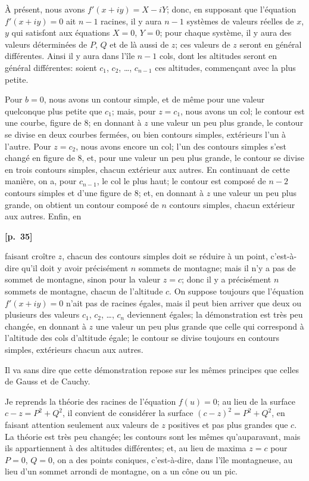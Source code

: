 \documentclass[11pt,a4paper]{book}
\begin{document}
\`A pr\'esent, nous avons $f'(x + iy) = X - iY$; donc, en supposant que l'\'equation $f'(x + iy) = 0$ ait $n - 1$ racines, il y aura $n - 1$ syst\`emes de valeurs r\'eelles de $x$, $y$ qui satisfont aux \'equations $X = 0$, $Y = 0$; pour chaque syst\`eme, il y aura des valeurs d\'etermin\'ees de $P$, $Q$ et de l\`a aussi de $z$; ces valeurs de $z$ seront en g\'en\'eral diff\'erentes. Ainsi il y aura dans l'\^ile $n - 1$ cols, dont les altitudes seront en g\'en\'eral diff\'erentes: soient $c_1$, $c_2$, \ldots, $c_{n-1}$ ces altitudes, commen\c{c}ant avec la plus petite.

Pour $b = 0$, nous avons un contour simple, et de m\^eme pour une valeur quelconque plus petite que $c_1$; mais, pour $z = c_1$, nous avons un col; le contour est une courbe, figure de 8; en donnant \`a $z$ une valeur un peu plus grande, le contour se divise en deux courbes ferm\'ees, ou bien contours simples, ext\'erieurs l'un \`a l'autre. Pour $z = c_2$, nous avons encore un col; l'un des contours simples s'est chang\'e en figure de 8, et, pour une valeur un peu plus grande, le contour se divise en trois contours simples, chacun ext\'erieur aux autres. En continuant de cette mani\`ere, on a, pour $c_{n-1}$, le col le plus haut; le contour est compos\'e de $n - 2$ contours simples et d'une figure de 8; et, en donnant \`a $z$ une valeur un peu plus grande, on obtient un contour compos\'e de $n$ contours simples, chacun ext\'erieur aux autres. Enfin, en

\vspace{0.5em}
\noindent\textbf{[p.\ 35]}

faisant cro\^itre $z$, chacun des contours simples doit se r\'eduire \`a un point, c'est-\`a-dire qu'il doit y avoir pr\'ecis\'ement $n$ sommets de montagne; mais il n'y a pas de sommet de montagne, sinon pour la valeur $z = c$; donc il y a pr\'ecis\'ement $n$ sommets de montagne, chacun de l'altitude $c$. On suppose toujours que l'\'equation $f'(x + iy) = 0$ n'ait pas de racines \'egales, mais il peut bien arriver que deux ou plusieurs des valeurs $c_1$, $c_2$, \ldots, $c_n$ deviennent \'egales; la d\'emonstration est tr\`es peu chang\'ee, en donnant \`a $z$ une valeur un peu plus grande que celle qui correspond \`a l'altitude des cols d'altitude \'egale; le contour se divise toujours en contours simples, ext\'erieurs chacun aux autres.

Il va sans dire que cette d\'emonstration repose sur les m\^emes principes que celles de Gauss et de Cauchy.

Je reprends la th\'eorie des racines de l'\'equation $f(u) = 0$; au lieu de la surface $c - z = P^2 + Q^2$, il convient de consid\'erer la surface $(c - z)^2 = P^2 + Q^2$, en faisant attention seulement aux valeurs de $z$ positives et pas plus grandes que $c$. La th\'eorie est tr\`es peu chang\'ee; les contours sont les m\^emes qu'auparavant, mais ils appartiennent \`a des altitudes diff\'erentes; et, au lieu de maxima $z = c$ pour $P = 0$, $Q = 0$, on a des points coniques, c'est-\`a-dire, dans l'\^ile montagneuse, au lieu d'un sommet arrondi de montagne, on a un c\^one ou un pic.
\end{document}
